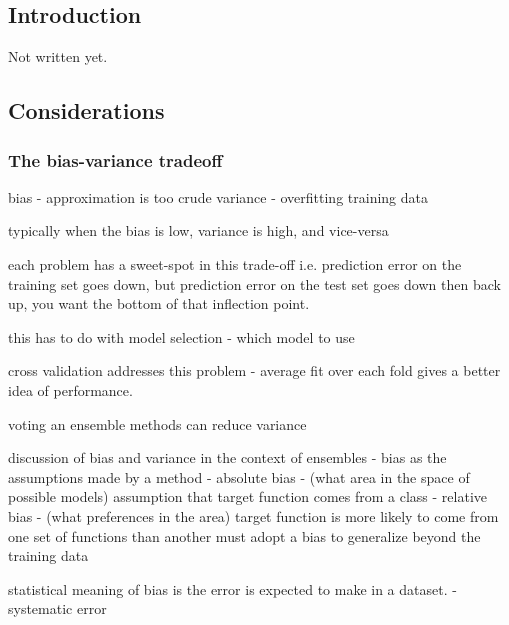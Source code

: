 


\begin{bibunit}

\chapter{Introduction}
\label{chap:intro}

Not written yet.




\section{Considerations}


\subsection{The bias-variance tradeoff}

bias - approximation is too crude
variance - overfitting training data

typically when the bias is low, variance is high, and vice-versa

each problem has a sweet-spot in this trade-off
i.e. prediction error on the training set goes down, but prediction error on the test set goes down then back up, you want the bottom of that inflection point.

this has to do with model selection - which model to use

cross validation addresses this problem - average fit over each fold gives a better idea of performance.

voting an ensemble methods can reduce variance

discussion of bias and variance in the context of ensembles \cite{Dietterich1995}
- bias as the assumptions made by a method
- absolute bias - (what area in the space of possible models) assumption that target function comes from a class
- relative bias - (what preferences in the area) target function is more likely to come from one set of functions than another
must adopt a bias to generalize beyond the training data

statistical meaning of bias is the error is expected to make in a dataset. - systematic error


\end{bibunit}
